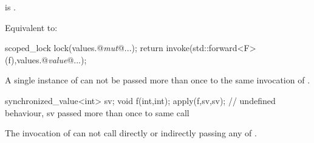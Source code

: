 \begin{itemdescr}
    

\pnum
\constraints
{} is .

\pnum
\effects
Equivalent to:

\begin{codeblock}
    scoped_lock lock(values.@\emph{mut}@...);
    return invoke(std::forward<F>(f),values.@\emph{value}@...);
\end{codeblock}

\begin{note} A single instance of  can not be
passed more than once to the same invocation of .
\begin{example}

\begin{codeblock}
      synchronized_value<int> sv;
      void f(int,int);
      apply(f,sv,sv); // undefined behaviour, sv passed more than once to same call
\end{codeblock}
\end{example}
 \end{note}

\begin{note} The invocation of  can not call 
directly or indirectly passing any of . 
\end{note}
\end{itemdescr}

